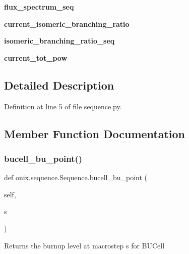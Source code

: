 \begin{DoxyCompactItemize}
{\bfseries flux\+\_\+spectrum\+\_\+seq}
\item 
\mbox{\label{classonix_1_1sequence_1_1Sequence_a24ad0de9d35724af7f1258ef5736d854}} 
{\bfseries current\+\_\+isomeric\+\_\+branching\+\_\+ratio}
\item 
\mbox{\label{classonix_1_1sequence_1_1Sequence_a1c530aff48d790a7cbfc46d53a7640bf}} 
{\bfseries isomeric\+\_\+branching\+\_\+ratio\+\_\+seq}
\item 
\mbox{\label{classonix_1_1sequence_1_1Sequence_ae4cb637a41fc9dad084a3dc22e77ec41}} 
{\bfseries current\+\_\+tot\+\_\+pow}
\end{DoxyCompactItemize}


\subsection{Detailed Description}


Definition at line 5 of file sequence.\+py.



\subsection{Member Function Documentation}
\mbox{\label{classonix_1_1sequence_1_1Sequence_a1b3e9b5c744a2d66741a194bcacc4bba}} 
\subsubsection{\texorpdfstring{bucell\+\_\+bu\+\_\+point()}{bucell\_bu\_point()}}
{\footnotesize\ttfamily def onix.\+sequence.\+Sequence.\+bucell\+\_\+bu\+\_\+point (\begin{DoxyParamCaption}\item[{}]{self,  }\item[{}]{s }\end{DoxyParamCaption})}

\begin{DoxyVerb}Returns the burnup level at macrostep s for BUCell\end{DoxyVerb}
 

